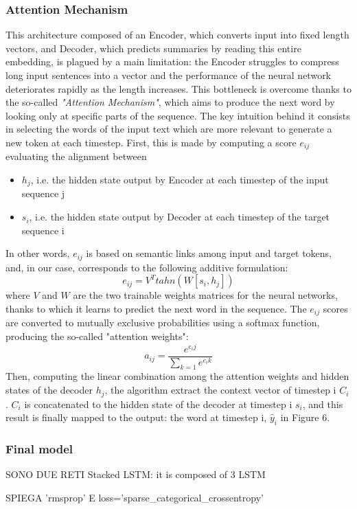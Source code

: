 \documentclass[fleqn,10pt]{SelfArx} %
\begin{document}
\subsubsection{Attention Mechanism}
This architecture composed of an Encoder, which converts input into fixed length vectors, and Decoder, which predicts summaries by reading this entire embedding, is plagued by a main limitation: the Encoder struggles to compress long input sentences into a vector and the performance of the neural network deteriorates rapidly as the length increases. This bottleneck is overcome thanks to the so-called \textit{"Attention Mechanism"}, which aims to produce the next word by looking only at specific parts of the sequence. The key intuition behind it consists in selecting the words of the input text which are more relevant to generate a new token at each timestep. First, this is made by computing a score $e_{ij}$ evaluating the alignment between
\begin{itemize}
    \item $h_j$, i.e. the hidden state output by Encoder at each timestep of the input sequence j
    \item $s_i$, i.e. the hidden state output by Decoder at each timestep of the target sequence i 
\end{itemize}
In other words, $e_{ij}$ is based on semantic links among input and target tokens, and, in our case, corresponds to the following additive formulation:
$$e_{ij}=V^Ttahn(W[s_i,h_j])$$ 
where $V$ and $W$ are the two trainable weights matrices for the neural networks, thanks to which it learns to predict the next word in the sequence. The $e_{ij}$ scores are converted to mutually exclusive probabilities using a softmax function, producing the so-called "attention weights": 
$$a_{ij}=\frac{e^{e_ij}}{\sum_{k=1}e^{e_ik}}$$
Then, computing the linear combination among the attention weights and hidden states of the decoder $h_j$, the algorithm extract the context vector of timestep i $C_i$. $C_i$ is concatenated to the hidden state of the decoder at timestep i $s_i$, and this result is finally mapped to the output: the word at timestep i, $\hat{y}_i$ in Figure 6.\\
\subsubsection{Final model}
SONO DUE RETI
Stacked LSTM: it is composed of 3 LSTM 

SPIEGA 'rmsprop' E loss='sparse\_categorical\_crossentropy'\\
\end{document}
